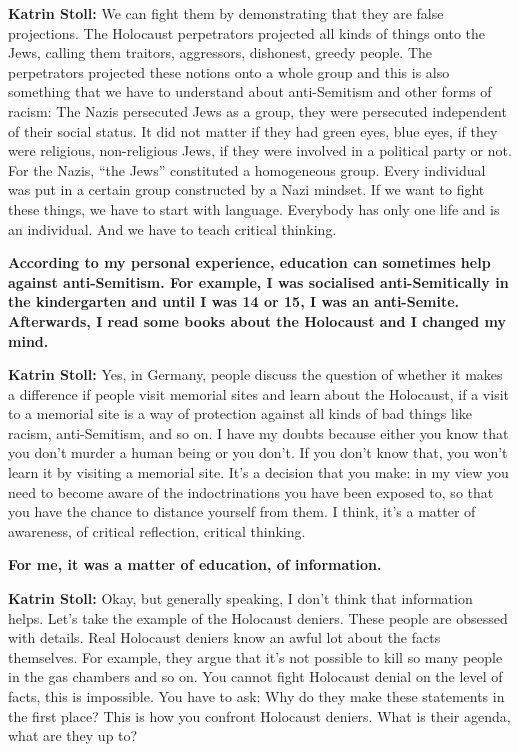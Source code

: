 \textbf{Katrin Stoll:} We can fight them by demonstrating that they are false projections. The Holocaust perpetrators projected all kinds of things onto the Jews, calling them traitors, aggressors, dishonest, greedy people. The perpetrators projected these notions onto a whole group and this is also something that we have to understand about anti-Semitism and other forms of racism: The Nazis persecuted Jews as a group, they were persecuted independent of their social status. It did not matter if they had green eyes, blue eyes, if they were religious, non-religious Jews, if they were involved in a political party or not. For the Nazis, ``the Jews'' constituted a homogeneous group. Every individual was put in a certain group constructed by a Nazi mindset. If we want to fight these things, we have to start with language. Everybody has only one life and is an individual. And we have to teach critical thinking.   

\textbf{According to my personal experience, education can sometimes help against anti-Semitism. For example, I was socialised anti-Semitically in the kindergarten and until I was 14 or 15, I was an anti-Semite. Afterwards, I read some books about the Holocaust and I changed my mind.}

\textbf{Katrin Stoll:} Yes, in Germany, people discuss the question of whether it makes a difference if people visit memorial sites and learn about the Holocaust, if a visit to a memorial site is a way of protection against all kinds of bad things like racism, anti-Semitism, and so on. I have my doubts because either you know that you don’t murder a human being or you don’t. If you don’t know that, you won’t learn it by visiting a memorial site. It’s a decision that you make: in my view you need to become aware of the indoctrinations you have been exposed to, so that you have the chance to distance yourself from them. I think, it’s a matter of awareness, of critical reflection, critical thinking.

\textbf{For me, it was a matter of education, of information.} 

\textbf{Katrin Stoll:} Okay, but generally speaking, I don’t think that information helps. Let’s take the example of the Holocaust deniers. These people are obsessed with details. Real Holocaust deniers know an awful lot about the facts themselves. For example, they argue that it’s not possible to kill so many people in the gas chambers and so on. You cannot fight Holocaust denial on the level of facts, this is impossible. You have to ask: Why do they make these statements in the first place? This is how you confront Holocaust deniers. What is their agenda, what are they up to? 

